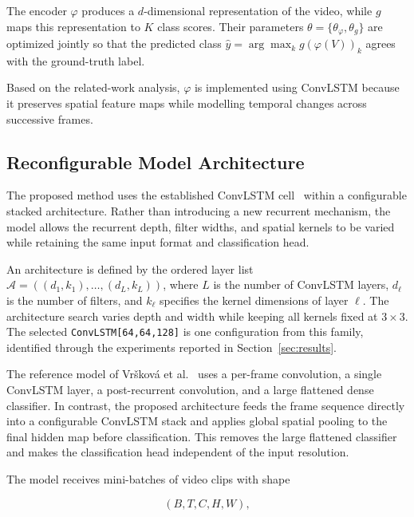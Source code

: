 \documentclass[journal,article,submit,moreauthors]{Definitions/mdpi}
\begin{document}
    The encoder $\varphi$ produces a $d$-dimensional representation
    of the video, while $g$ maps this representation to $K$ class 
    scores. Their parameters $\theta=\{\theta_\varphi,\theta_g\}$ 
    are optimized jointly so that the predicted class
    $\hat{y}=\arg\max_k g(\varphi(V))_k$ agrees with the 
    ground-truth label.

    Based on the related-work analysis, $\varphi$ is implemented 
    using ConvLSTM because it preserves spatial feature maps while 
    modelling temporal changes across successive frames.

    \subsection{Reconfigurable Model Architecture}
    \label{sec:architecture}

    The proposed method uses the established ConvLSTM cell~\cite{
    xingjian2015convlstm,vrskova2022,vrskova2023_3dcnn_convlstm} 
    within a configurable stacked architecture. Rather than 
    introducing a new recurrent mechanism, the model allows the 
    recurrent depth, filter widths, and spatial kernels to be 
    varied while retaining the same input format and 
    classification head.

    An architecture is defined by the ordered layer list
    $\mathcal{A}=((d_1,k_1),\ldots,(d_L,k_L))$, where $L$ is the 
    number of ConvLSTM layers, $d_\ell$ is the number of filters, 
    and $k_\ell$ specifies the kernel dimensions of layer $\ell$. 
    The architecture search varies depth and width while keeping 
    all kernels fixed at $3\times3$. The selected 
    \texttt{ConvLSTM[64,64,128]} is one configuration from this 
    family, identified through the experiments reported in 
    Section~\ref{sec:results}.

    The reference model of Vršková et al.~\cite{vrskova2022} 
    uses a per-frame convolution, a single ConvLSTM layer, a 
    post-recurrent convolution, and a large flattened dense 
    classifier. In contrast, the proposed architecture feeds 
    the frame sequence directly into a configurable ConvLSTM 
    stack and applies global spatial pooling to the final 
    hidden map before classification. This removes the large
    flattened classifier and makes the classification head 
    independent of the input resolution.

    The model receives mini-batches of video clips with shape

    \begin{equation}
        (B, T, C, H, W),
        \label{eq:batch}
    \end{equation}
\end{document}
